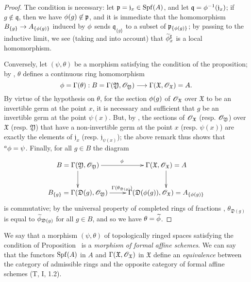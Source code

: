 \begin{proof}
\label{proof-1.10.2.2}
The condition is necessary: let $\mathfrak{p}=\mathfrak{j}_x\in\operatorname{Spf}(A)$, and let $\mathfrak{q}=\phi^{-1}(\mathfrak{j}_x)$; if $g\not\in\mathfrak{q}$, then we have $\phi(g)\not\in\mathfrak{p}$, and it is immediate that the homomorphism
$B_{\{g\}}\to A_{\{\vphi(g)\}}$ induced by $\phi$  sends $\mathfrak{q}_{\{g\}}$ to a subset of $\mathfrak{p}_{\{\phi(g)\}}$; by passing to the inductive limit, we see (taking  and  into account) that $\widetilde{\phi}_x^\sharp$ is a local homomorphism.

Conversely, let $(\psi,\theta)$ be a morphism satisfying the condition of the proposition;
by , $\theta$ defines a continuous ring homomorphism
\[
  \vphi=\Gamma(\theta):B=\Gamma(\mathfrak{Y},\sh{O}_\mathfrak{Y})\to\Gamma(\mathfrak{X},\sh{O}_\mathfrak{X})=A.
\]
By virtue of the hypothesis on $\theta$, for the section $\phi(g)$ of $\mathscr{O}_\mathfrak{X}$ over $\mathfrak{X}$ to be an invertible germ at the point $x$, it is necessary and sufficient that $g$ be an invertible germ at the point $\psi(x)$.
But, by , the sections of $\mathscr{O}_\mathfrak{X}$ (resp. $\mathscr{O}_\mathfrak{Y}$) over $\mathfrak{X}$ (resp. $\mathfrak{Y}$) that have a non-invertible germ at the point $x$ (resp. $\psi(x)$) are exactly the elements of $\mathfrak{j}_x$
(resp. $\mathfrak{j}_{\psi(x)}$);
the above remark thus shows that ${}^a\phi=\psi$.
Finally, for all $g\in B$ the diagram
\[
  \xymatrix{
    B=\Gamma(\mathfrak{Y},\sh{O}_\mathfrak{Y})\ar[r]^\vphi\ar[d] &
    \Gamma(\mathfrak{X},\sh{O}_\mathfrak{X})=A\ar[d]\\
    B_{\{g\}}=\Gamma(\mathfrak{D}(g),\sh{O}_\mathfrak{Y})\ar[r]^{\Gamma(\theta_{\mathfrak{D}(g)})} &
    \Gamma(\mathfrak{D}(\vphi(g)),\sh{O}_\mathfrak{X})=A_{\{\vphi(g)\}}
  }
\]
is commutative; by the universal property of completed rings of fractions , $\theta_{\mathfrak{D}(g)}$ is equal to $\widetilde{\phi}_{\mathfrak{D}(g)}$ for all $g\in B$, and so  we have $\theta=\widetilde{\phi}$.
\end{proof}

We say that a morphism $(\psi,\theta)$ of topologically ringed spaces satisfying the condition of Proposition~ is a \emph{morphism of formal affine schemes}.
We can say that the functors $\operatorname{Spf}(A)$ in $A$ and $\Gamma(\mathfrak{X},\mathscr{O}_\mathfrak{X})$ in $\mathfrak{X}$ define an \emph{equivalence} between the category of admissible rings and the opposite category of formal affine schemes (T, I, 1.2).

